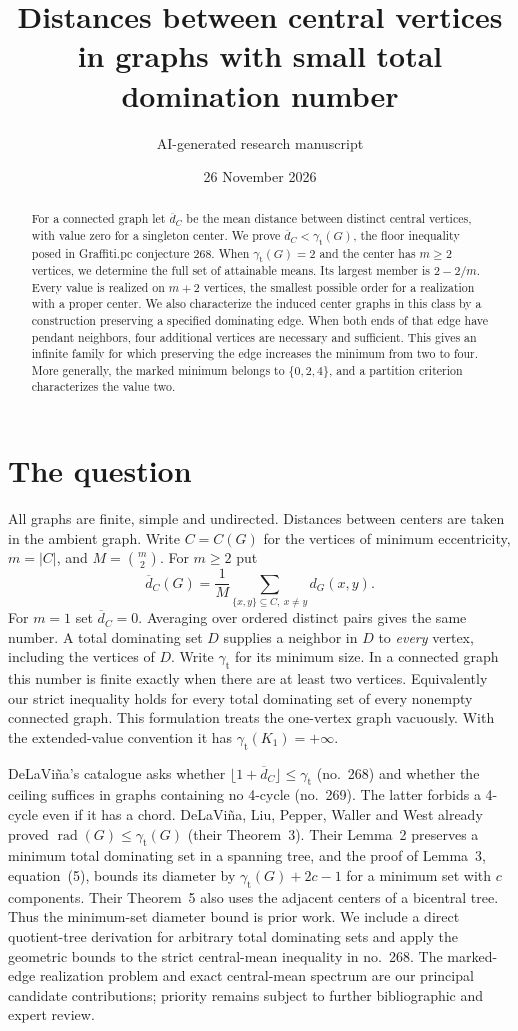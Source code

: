 \documentclass[11pt]{article}
\title{Distances between central vertices in graphs with small total domination number}
\author{AI-generated research manuscript}
\date{26 November 2026}
\newcommand{\gt}{\gamma_{\mathrm t}}
\newcommand{\rad}{\operatorname{rad}}
\newcommand{\av}{\overline d_C}
\begin{document}
\maketitle
\begin{abstract}
For a connected graph let $\av$ be the mean distance between distinct central
vertices, with value zero for a singleton center. We prove
$\av<\gt(G)$, the floor inequality posed in Graffiti.pc conjecture 268.
When $\gt(G)=2$ and the center has $m\ge2$ vertices, we determine the full set
of attainable means. Its largest member is $2-2/m$. Every value is realized
on $m+2$ vertices, the smallest possible order for a realization with a proper
center. We also characterize the induced center graphs in this class by a
construction preserving a specified dominating edge. When both ends of
that edge have pendant neighbors, four additional vertices are necessary
and sufficient. This gives an infinite family for which preserving the
edge increases the minimum from two to four. More generally, the marked minimum belongs to
$\{0,2,4\}$, and a partition criterion characterizes the value two.
\end{abstract}

\section{The question}
All graphs are finite, simple and undirected. Distances between centers are
taken in the ambient graph. Write $C=C(G)$ for the vertices of minimum
eccentricity, $m=|C|$, and $M=\binom m2$.
For $m\ge2$ put
\[
   \av(G)=\frac{1}{M}\sum_{\{x,y\}\subseteq C,\ x\ne y}d_G(x,y).
\]
For $m=1$ set $\av=0$. Averaging over ordered distinct pairs gives the same
number. A total dominating set $D$ supplies a neighbor in $D$ to \emph{every}
vertex, including the vertices of $D$. Write $\gt$ for its minimum size.
In a connected graph this number is finite exactly when there are at least
two vertices. Equivalently our strict inequality holds for every total
dominating set of every nonempty connected graph. This formulation treats the
one-vertex graph vacuously. With the extended-value convention it has
$\gt(K_1)=+\infty$.

DeLaVi\~na's catalogue \cite{wall} asks whether
$\lfloor1+\av\rfloor\le\gt$ (no.\ 268) and whether the ceiling suffices in
graphs containing no 4-cycle (no.\ 269). The latter forbids a 4-cycle even if
it has a chord. DeLaVi\~na, Liu, Pepper, Waller and West \cite{dlpww}
already proved $\rad(G)\le\gt(G)$ (their Theorem~3). Their Lemma~2
preserves a minimum total dominating set in a spanning tree, and the proof
of Lemma~3, equation~(5), bounds its diameter by $\gt(G)+2c-1$ for a
minimum set with $c$ components. Their Theorem~5 also uses the adjacent
centers of a bicentral tree. Thus the minimum-set diameter bound is prior
work. We include a direct quotient-tree derivation for arbitrary total
dominating sets and apply the geometric bounds to the strict central-mean
inequality in no.\ 268. The marked-edge realization problem and exact
central-mean spectrum are our principal candidate contributions; priority
remains subject to further bibliographic and expert review.
\end{document}

